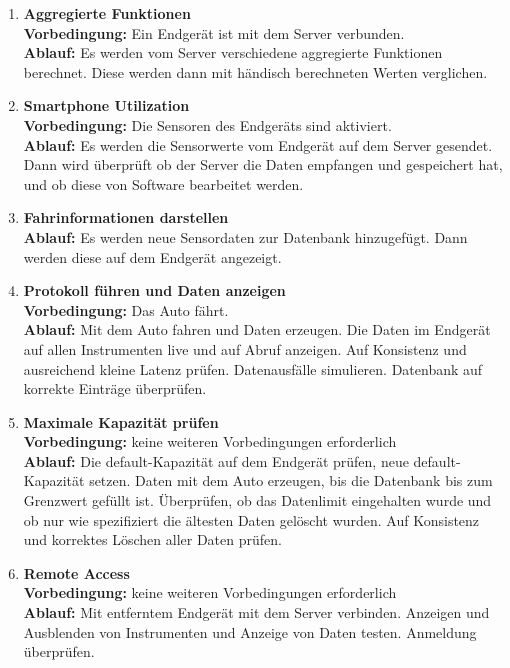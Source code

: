 \documentclass[pflichtenheft.tex]{subfiles}
\begin{document}
\begin{enumerate}
\item{\textbf{Aggregierte Funktionen}} \\
\textbf{Vorbedingung: } Ein Endgerät ist mit dem Server verbunden. \\ 
\textbf{Ablauf: } Es werden vom Server verschiedene aggregierte Funktionen berechnet. Diese werden dann mit händisch berechneten Werten verglichen.

\item{\textbf{Smartphone Utilization}} \\
\textbf{Vorbedingung: } Die Sensoren des Endgeräts sind aktiviert. \\
\textbf{Ablauf: } Es werden die Sensorwerte vom Endgerät auf dem Server gesendet. Dann wird überprüft ob der Server die Daten empfangen und gespeichert hat, und ob diese von Software bearbeitet werden.

\item{\textbf{Fahrinformationen darstellen}} \\
\textbf{Ablauf: } Es werden neue Sensordaten zur Datenbank hinzugefügt. Dann werden diese auf dem Endgerät angezeigt.

\item{\textbf{Protokoll führen und Daten anzeigen}} \\
\textbf{Vorbedingung: } Das Auto fährt. \\
\textbf{Ablauf: } Mit dem Auto fahren und Daten erzeugen. Die Daten im Endgerät auf allen Instrumenten live und auf Abruf anzeigen. Auf Konsistenz und ausreichend kleine Latenz prüfen. Datenausfälle simulieren. Datenbank auf korrekte Einträge überprüfen.

\item{\textbf{Maximale Kapazität prüfen}} \\
\textbf{Vorbedingung: } keine weiteren Vorbedingungen erforderlich \\
\textbf{Ablauf: } Die default-Kapazität auf dem Endgerät prüfen, neue default-Kapazität setzen. Daten mit dem Auto erzeugen, bis die Datenbank bis zum Grenzwert gefüllt ist. Überprüfen, ob das Datenlimit eingehalten wurde und ob nur wie spezifiziert die ältesten Daten gelöscht wurden. Auf Konsistenz und korrektes Löschen aller Daten prüfen.

\item{\textbf{Remote Access}} \\
\textbf{Vorbedingung: } keine weiteren Vorbedingungen erforderlich \\
\textbf{Ablauf: } Mit entferntem Endgerät mit dem Server verbinden. Anzeigen und Ausblenden von Instrumenten und Anzeige von Daten testen. Anmeldung überprüfen.


\end{enumerate}
\end{document}
